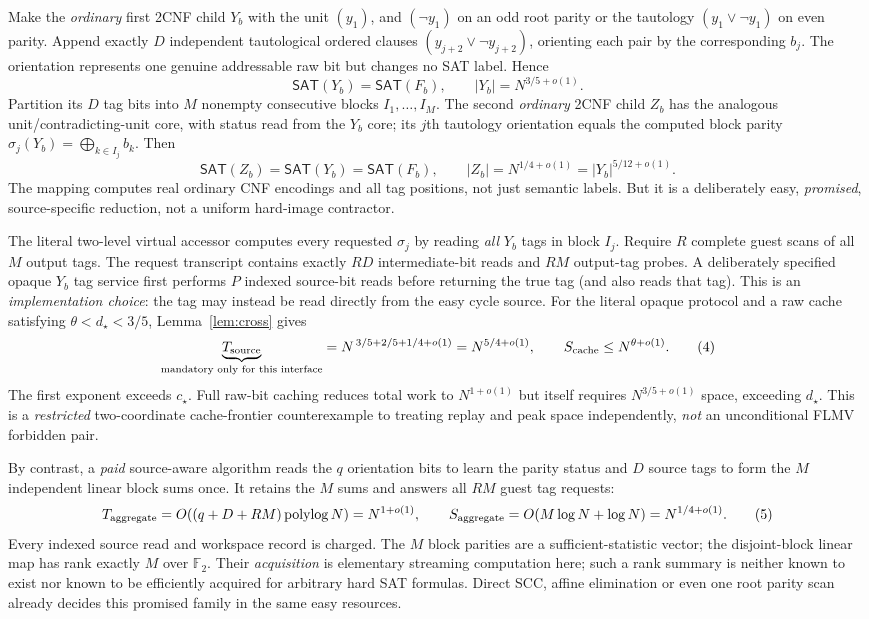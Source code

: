 \documentclass[11pt]{article}
\newcommand{\SAT}{\mathsf{SAT}}
\begin{document}
Make the \emph{ordinary} first 2CNF child $Y_b$ with the unit
$(y_1)$, and $(\neg y_1)$ on an odd root parity or the
tautology $(y_1\vee\neg y_1)$ on even parity. Append exactly
$D$ independent tautological ordered clauses
$(y_{j+2}\vee\neg y_{j+2})$, orienting each pair by the
corresponding $b_j$. The orientation represents one genuine
addressable raw bit but changes no SAT label. Hence
\[
\SAT(Y_b)=\SAT(F_b),\qquad |Y_b|=N^{3/5+o(1)}.
\]
Partition its $D$ tag bits into $M$ nonempty consecutive
blocks $I_1,\ldots,I_M$. The second \emph{ordinary} 2CNF
child $Z_b$ has the analogous unit/contradicting-unit core,
with status read from the $Y_b$ core; its $j$th tautology
orientation equals the computed block parity
$\sigma_j(Y_b)=\bigoplus_{k\in I_j}b_k$. Then
\[
\SAT(Z_b)=\SAT(Y_b)=\SAT(F_b),\qquad
|Z_b|=N^{1/4+o(1)}=|Y_b|^{5/12+o(1)}.\tag{3}
\]
The mapping computes real ordinary CNF encodings and all tag
positions, not just semantic labels. But it is a deliberately
easy, \emph{promised}, source-specific reduction, not a uniform
hard-image contractor.

The literal two-level virtual accessor computes every requested
$\sigma_j$ by reading \emph{all} $Y_b$ tags in block $I_j$.
Require $R$ complete guest scans of all $M$ output tags.
The request transcript contains exactly $RD$ intermediate-bit
reads and $RM$ output-tag probes. A deliberately specified opaque
$Y_b$ tag service first performs $P$ indexed source-bit reads
before returning the true tag (and also reads that tag).
This is an \emph{implementation choice}: the tag may instead
be read directly from the easy cycle source. For the literal
opaque protocol and a raw cache satisfying
$\theta<d_\star<3/5$, Lemma~\ref{lem:cross} gives
\[
\underbrace{T_{\rm source}}_{\text{mandatory only for this interface}}
=N^{\,3/5+2/5+1/4+o(1)}
=N^{5/4+o(1)},\qquad
S_{\rm cache}\le N^{\theta+o(1)}. \tag{4}
\]
The first exponent exceeds $c_\star$. Full raw-bit caching
reduces total work to $N^{1+o(1)}$ but itself requires
$N^{3/5+o(1)}$ space, exceeding $d_\star$. This is a
\emph{restricted} two-coordinate cache-frontier counterexample
to treating replay and peak space independently, \emph{not}
an unconditional FLMV forbidden pair.

By contrast, a \emph{paid} source-aware algorithm reads the
$q$ orientation bits to learn the parity status and $D$ source
tags to form the $M$ independent linear block sums once.
It retains the $M$ sums and answers all $RM$ guest tag requests:
\[
T_{\rm aggregate}
=O((q+D+RM)\operatorname{polylog}N)=N^{1+o(1)},\qquad
S_{\rm aggregate}=O(M\log N+\log N)=N^{1/4+o(1)}. \tag{5}
\]
Every indexed source read and workspace record is charged.
The $M$ block parities are a sufficient-statistic vector;
the disjoint-block linear map has rank exactly $M$ over
$\mathbb F_2$. Their \emph{acquisition} is elementary
streaming computation here; such a rank summary is neither
known to exist nor known to be efficiently acquired for
arbitrary hard SAT formulas. Direct SCC, affine elimination
or even one root parity scan already decides this promised
family in the same easy resources.
\end{document}
